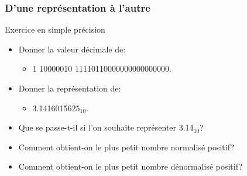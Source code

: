 \documentclass{beamer}
\begin{document}
\begin{frame}
\frametitle{D'une représentation à l'autre}

\begin{block}{Exercice en simple précision}
\begin{itemize}
\item Donner la valeur décimale de:
\begin{itemize}
\item 1 10000010 11110110000000000000000.
\end{itemize}

\item Donner la représentation de:
\begin{itemize}
\item 3.1416015625$_{10}$.
\end{itemize}

\item Que se passe-t-il si l'on souhaite représenter 3.14$_{10}$?

\item Comment obtient-on le plus petit nombre normalisé positif?

\item Comment obtient-on le plus petit nombre dénormalisé positif?
\end{itemize}
\end{block}
\end{frame}
\end{document}
